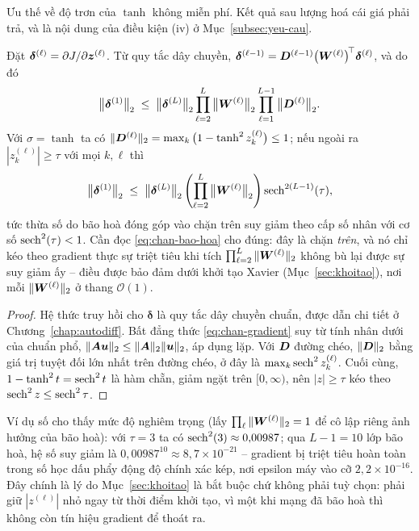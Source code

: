 Ưu thế về độ trơn của $\tanh$ không miễn phí. Kết quả sau lượng hoá cái giá phải
trả, và là nội dung của điều kiện (iv) ở Mục~\ref{subsec:yeu-cau}.
 
\begin{menhde}
\label{md:tich-gradient}
Đặt $\bm{\delta}^{(\ell)} = \partial J/\partial\bm{z}^{(\ell)}$. Từ quy tắc dây
chuyền, $\bm{\delta}^{(\ell-1)} = \bm{D}^{(\ell-1)}
\big(\bm{W}^{(\ell)}\big)^{\!\top}\bm{\delta}^{(\ell)}$, và do đó
\begin{equation}
\big\|\bm{\delta}^{(1)}\big\|_2
 \;\le\; \big\|\bm{\delta}^{(L)}\big\|_2
   \prod_{\ell=2}^{L} \big\|\bm{W}^{(\ell)}\big\|_2
   \prod_{\ell=1}^{L-1} \big\|\bm{D}^{(\ell)}\big\|_2 .
\label{eq:chan-gradient}
\end{equation}
Với $\sigma = \tanh$ ta có
$\|\bm{D}^{(\ell)}\|_2 = \max_k \big(1 - \tanh^2 z^{(\ell)}_k\big) \le 1$; nếu
ngoài ra $|z^{(\ell)}_k| \ge \tau$ với mọi $k,\ell$ thì
\begin{equation}
\big\|\bm{\delta}^{(1)}\big\|_2 \;\le\;
\big\|\bm{\delta}^{(L)}\big\|_2 \left(\prod_{\ell=2}^{L}
\big\|\bm{W}^{(\ell)}\big\|_2\right)
\operatorname{sech}^{2(L-1)}(\tau),
\label{eq:chan-bao-hoa}
\end{equation}
tức thừa số do bão hoà đóng góp vào chặn trên suy giảm theo cấp số nhân với cơ
số $\operatorname{sech}^{2}(\tau) < 1$. Cần đọc \eqref{eq:chan-bao-hoa} cho đúng: đây là chặn
\emph{trên}, và nó chỉ kéo theo gradient thực sự triệt tiêu khi tích
$\prod_{\ell=2}^{L}\|\bm{W}^{(\ell)}\|_2$ không bù lại được sự suy giảm ấy -- điều
được bảo đảm dưới khởi tạo Xavier (Mục~\ref{sec:khoitao}), nơi mỗi
$\|\bm{W}^{(\ell)}\|_2$ ở thang $\mathcal{O}(1)$.
\end{menhde}
 
\begin{proof}
Hệ thức truy hồi cho $\bm{\delta}$ là quy tắc dây chuyền chuẩn, được dẫn chi
tiết ở Chương~\ref{chap:autodiff}. Bất đẳng thức \eqref{eq:chan-gradient} suy từ
tính nhân dưới của chuẩn phổ, $\|\bm{A}\bm{u}\|_2 \le \|\bm{A}\|_2\|\bm{u}\|_2$, áp
dụng lặp. Với $\bm{D}$ đường chéo, $\|\bm{D}\|_2$ bằng giá trị tuyệt đối lớn nhất trên
đường chéo, ở đây là $\max_k \operatorname{sech}^2 z^{(\ell)}_k$. Cuối cùng,
$1 - \tanh^2 t = \operatorname{sech}^2 t$ là hàm chẵn, giảm ngặt trên $[0,\infty)$, nên
$|z| \ge \tau$ kéo theo $\operatorname{sech}^2 z \le \operatorname{sech}^2 \tau$.
\end{proof}
 
Ví dụ số cho thấy mức độ nghiêm trọng (lấy
$\prod_{\ell}\|\bm{W}^{(\ell)}\|_2 = 1$ để cô lập riêng ảnh hưởng của bão hoà): với
$\tau = 3$ ta có
$\operatorname{sech}^2(3) \approx 0{,}00987$; qua $L-1 = 10$ lớp bão hoà, hệ số suy giảm là
$0{,}00987^{10} \approx 8{,}7\times10^{-21}$ -- gradient bị triệt tiêu hoàn toàn
trong số học dấu phẩy động độ chính xác kép, nơi epsilon máy vào cỡ
$2{,}2\times10^{-16}$. Đây chính là lý do Mục~\ref{sec:khoitao} là bắt buộc chứ
không phải tuỳ chọn: phải giữ $|z^{(\ell)}|$ nhỏ ngay từ thời điểm khởi tạo, vì
một khi mạng đã bão hoà thì không còn tín hiệu gradient để thoát ra.
 
